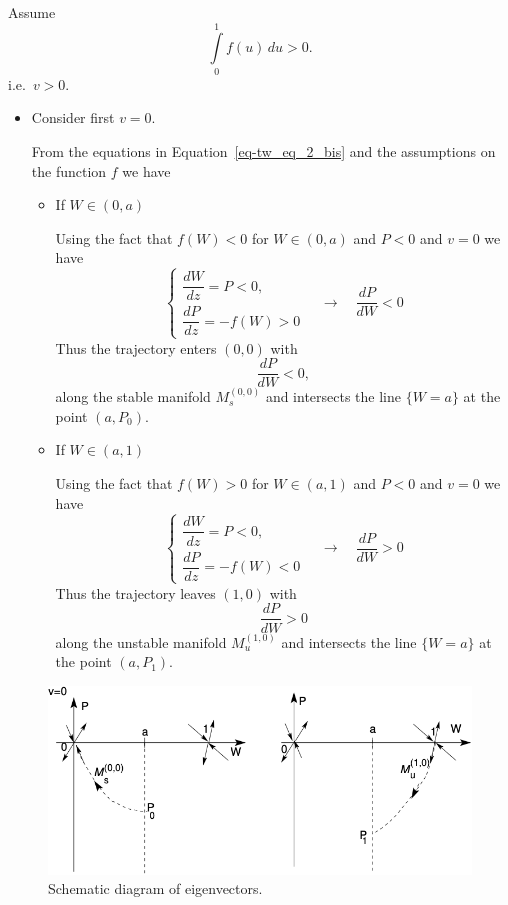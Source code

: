 \documentclass[
  letterpaper,
  DIV=11,
  numbers=noendperiod]{scrreprt}
\theoremstyle{plain}
\theoremstyle{definition}
\theoremstyle{plain}
\theoremstyle{remark}
\begin{document}
Assume \[
 \int\limits_{0}^{1}f(u) \, du > 0.
\] i.e.~\(v>0\).

\begin{itemize}
\item
  Consider first \(v=0\).

  From the equations in Equation~\ref{eq-tw_eq_2_bis} and the
  assumptions on the function \(f\) we have

  \begin{itemize}
  \item
    If \(W \in (0,a)\)

    Using the fact that \(f(W) <0\) for \(W \in (0,a)\) and \(P<0\) and
    \(v=0\) we have \[        
      \begin{cases}
      \dfrac{dW}{dz} = P <0, \\
      \dfrac{dP}{dz} = - f(W) >0
      \end{cases}  \quad  \rightarrow \quad \dfrac{dP}{dW} <0
      \] Thus the trajectory enters \((0,0)\) with \[ 
    \dfrac{dP}{dW} <0,
    \] along the stable manifold \(\textit{M}_s^{(0,0)}\) and intersects
    the line \(\{ W=a\}\) at the point \((a, P_0)\).
  \item
    If \(W \in (a,1)\)

    Using the fact that \(f(W) >0\) for \(W \in (a,1)\) and \(P<0\) and
    \(v=0\) we have \[
      \begin{cases}
      \dfrac{dW}{dz} = P <0, \\
      \dfrac{dP}{dz} = - f(W) <0
      \end{cases}  \quad  \rightarrow \quad \dfrac{dP}{dW} >0
      \] Thus the trajectory leaves \((1,0)\) with \[
       \dfrac{dP}{dW} >0
      \] along the unstable manifold \(\textit{M}_u^{(1,0)}\) and
    intersects the line \(\{ W=a\}\) at the point \((a, P_1)\).
  \end{itemize}
\end{itemize}

\begin{figure}

{\centering \includegraphics{fig1.png}

}

\caption{\label{fig-shooting}Schematic diagram of eigenvectors.}

\end{figure}
\end{document}
